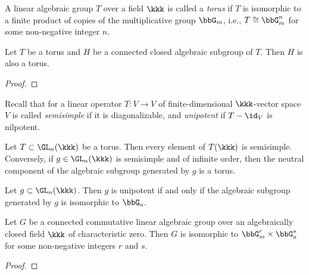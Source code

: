     \begin{definition}\label{def:torus_linear_algebraic_group}
        A linear algebraic group \(T\) over a field \(\kkk\) is called a \emph{torus} if \(T\) is isomorphic to a finite product of copies of the multiplicative group \(\bbG_m\), i.e., \(T \cong \bbG_m^n\) for some non-negative integer \(n\).
    \end{definition}

    \begin{lemma}\label{prop:subgroup_of_torus_is_torus}
        Let \(T\) be a torus and \(H\) be a connected closed algebraic subgroup of \(T\). 
        Then \(H\) is also a torus.
    \end{lemma}
    \begin{proof}
    \end{proof}

    Recall that for a linear operator \(T:V \to V\) of finite-dimensional \(\kkk\)-vector space \(V\) is called \emph{semisimple} if it is diagonalizable, and \emph{unipotent} if \(T-\id_V\) is nilpotent.

    \begin{proposition}\label{prop:semisimple_element_and_torus}
        Let \(T \subset \GL_n(\kkk)\) be a torus. 
        Then every element of \(T(\kkk)\) is semisimple.
        Conversely, if \(g \in \GL_n(\kkk)\) is semisimple and of infinite order, then the neutral component of the algebraic subgroup generated by \(g\) is a torus.
    \end{proposition}

    \begin{proposition}\label{prop:unipotent_element_and_G_a}
        Let \(g \subset \GL_n(\kkk)\).
        Then \(g\) is unipotent if and only if the algebraic subgroup generated by \(g\) is isomorphic to \(\bbG_a\).
    \end{proposition}

    \begin{theorem}\label{prop:structure_of_connected_commutative_linear_algebraic_groups}
        Let \(G\) be a connected commutative linear algebraic group over an algebraically closed field \(\kkk\) of characteristic zero. 
        Then \(G\) is isomorphic to \(\bbG_m^r \times \bbG_a^s\) for some non-negative integers \(r\) and \(s\).
    \end{theorem}
    \begin{proof}
    \end{proof}


